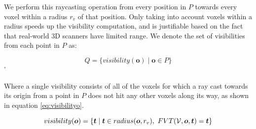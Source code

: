 We perform this raycasting operation from every position in \(P\) towards every voxel within a radius \(r_{v}\) of that position. Only taking into account voxels within a radius speeds up the visibility computation, and is justifiable based on the fact that real-world 3D scanners have limited range. We denote the set of visibilities from each point in \(P\) as:

\begin{equation}
    \label{eq:visibility_views}
Q = \{visibility(\boldsymbol{o}) \mid \boldsymbol{o} \in P\}
\end{equation}'

Where a single visibility consists of all of the voxels for which a ray cast towards its origin from a point in \(P\) does not hit any other voxels along its way, as shown in equation \ref{eq:visibilityo}.

\begin{equation}
    visibility(\boldsymbol{o}) = \{\boldsymbol{t} \mid \boldsymbol{t} \in radius(\boldsymbol{o}, r_{v}),\ FVT(\voxelgrid,\boldsymbol{o},\boldsymbol{t}) = \boldsymbol{t}\}
    \label{eq:visibilityo}
\end{equation}


